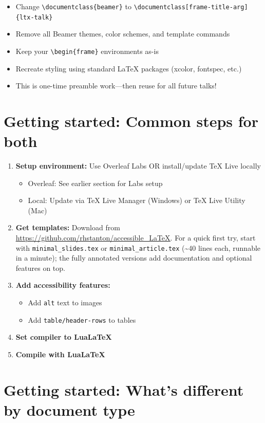 \documentclass{article}
\newcommand\GreenText[1]{\textcolor{AccessibleGreen}{#1}}
\newcommand{\urlu}[1]{\uline{\url{#1}}}        %
\begin{document}
\begin{itemize}
\item Change \texttt{\textbackslash documentclass\{beamer\}} to \texttt{\textbackslash documentclass[frame-title-arg]\{ltx-talk\}}
\item Remove all Beamer themes, color schemes, and template commands
\item Keep your \texttt{\textbackslash begin\{frame\}} environments as-is
\item Recreate styling using standard LaTeX packages (xcolor, fontspec, etc.)
\item This is \GreenText{one-time preamble work}---then reuse for all future talks!
\end{itemize}

\section{Getting started: Common steps for both}

\begin{enumerate}
\item \textbf{Setup environment:} Use Overleaf Labs OR install/update TeX Live locally
  \begin{itemize}
  \item Overleaf: See earlier section for Labs setup
  \item Local: Update via TeX Live Manager (Windows) or TeX Live Utility (Mac)
  \end{itemize}
\item \textbf{Get templates:} Download from \urlu{https://github.com/rhstanton/accessible_LaTeX}. For a quick first try, start with \texttt{minimal\_slides.tex} or \texttt{minimal\_article.tex} (\textasciitilde 40 lines each, runnable in a minute); the fully annotated versions add documentation and optional features on top.
\item \textbf{Add accessibility features:}
  \begin{itemize}
  \item Add \texttt{alt} text to images
  \item Add \texttt{table/header-rows} to tables
  \end{itemize}
\item \textbf{Set compiler to LuaLaTeX}
\item \textbf{Compile with LuaLaTeX}
\end{enumerate}

\section{Getting started: What's different by document type}
\end{document}
